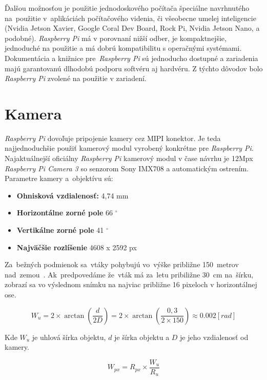         Ďalšou možnosťou je použitie jednodoskového počítača špeciálne navrhnutého na~použitie v~aplikáciách počítačového videnia, či všeobecne umelej inteligencie (Nvidia Jetson Xavier, Google Coral Dev Board, Rock Pi, Nvidia Jetson Nano, a podobné). \emph{Raspberry Pi} má v porovnaní nižší odber, je kompaktnejšie, jednoduché na použitie a má dobrú kompatibilitu s operačnými systémami. Dokumentácia a knižnice pre~\emph{Raspberry Pi} sú jednoducho dostupné a zariadenia majú garantovanú dlhodobú podporu softvéru aj hardvéru. Z týchto dôvodov bolo \emph{Raspberry Pi} zvolené na použitie v zariadení.

    \section{Kamera}

        \emph{Raspberry Pi} dovoľuje pripojenie kamery cez MIPI konektor. Je teda najjednoduchšie použiť kamerový modul vyrobený konkrétne pre \emph{Raspberry Pi}. Najaktuálnejší oficiálny \emph{Raspberry Pi} kamerový modul v čase návrhu je 12Mpx \emph{Raspberry Pi Camera 3} so senzorom Sony IMX708 a automatickým ostrením. Parametre kamery a~objektívu sú:
        \begin{itemize}
            \item \textbf{Ohnisková vzdialenosť:} 4,74 mm
            \item \textbf{Horizontálne zorné pole} 66 \(^\circ\)
            \item \textbf{Vertikálne zorné pole} 41 \(^\circ\)
            \item \textbf{Najväčšie rozlíšenie} 4608 x 2592 px
        \end{itemize}

        Za~bežných podmienok sa~vtáky pohybujú vo~výške približne 150~metrov nad~zemou~\cite{Wood2011}. Ak~predpovedáme že~vták má za~letu pribiližne 30~cm na~šírku, zobrazí sa vo výslednom snímku na najviac približne 16 pixeloch v horizontálnej ose.

        \begin{equation}
            W_{u} = 2 \times \arctan(\frac{d}{2D}) = 2 \times \arctan(\frac{0,3}{2 \times 150}) \approx 0.002 [rad]
        \end{equation}
        
        Kde $W_{u}$ je uhlová šírka objektu, $d$ je šírka objektu a $D$ je jeho vzdialenosť od kamery.

        \begin{equation}
            W_{px} = R_{px} \times \frac{W_{u}}{R_{u}}
        \end{equation}

